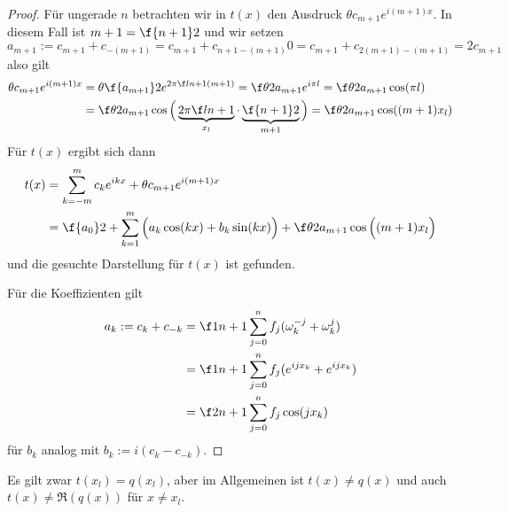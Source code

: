 \documentclass[11pt]{scrbook}
\begin{document}
\begin{st}
\begin{proof}
		Für ungerade $n$ betrachten wir in $t(x)$ den Ausdruck $\theta c_{m+1} e^{i(m+1)x}$.
		In diesem Fall ist $m+1 = \f {n+1}2$ und wir setzen 
		\[
			a_{m+1} := c_{m+1} + c_{-(m+1)} = c_{m+1} + c_{n+1-(m+1)}0= c_{m+1} + c_{2(m+1)-(m+1)} = 2 c_{m+1}
		\]
		also gilt
		\begin{align*}
			\theta c_{m+1} e^{i(m+1)x} 
			&= \theta \f {a_{m+1}}2 e^{2\pi \f l{n+1}(m+1)}
			= \f \theta 2 a_{m+1} e^{i\pi l}
			= \f \theta 2 a_{m+1} \cos(\pi l) \\
			&= \f \theta 2 a_{m+1} \cos\Big( \underbrace{2 \pi \f l{n+1}}_{x_l} \cdot \underbrace{\f {n+1}2}_{m+1} \Big) 
			= \f \theta 2 a_{m+1} \cos((m+1)x_l)
		\end{align*}
		Für $t(x)$ ergibt sich dann
		\begin{align*}
			t(x) &= \sum_{k=-m}^m c_k e^{ikx} + \theta c_{m+1} e^{i(m+1)x}\\
			&= \f {a_0}2 + \sum_{k=1}^m \Big(a_k \cos(kx) + b_k \sin(kx)\Big) + \f \theta 2 a_{m+1} \cos\Big((m+1)x_l\Big)
		\end{align*}
		und die gesuchte Darstellung für $t(x)$ ist gefunden.

		Für die Koeffizienten gilt 
		\begin{align*}
			a_k:= c_k + c_{-k} &= \f 1{n+1}\sum_{j=0}^n f_j (\omega_k^{-j}+\omega_k^j) \\
			&= \f 1{n+1} \sum_{j=0}^n f_j(e^{ijx_k} + e^{ijx_k})\\
			&= \f 2{n+1} \sum_{j=0}^n f_j \cos (jx_k)
		\end{align*}
		für $b_k$ analog mit $b_k := i(c_k -c_{-k})$.
	\end{proof}
	\begin{note}
		Es gilt zwar $t(x_l)=q(x_l)$, aber im Allgemeinen ist $t(x)\neq q(x)$ und auch $t(x)\neq \Re(q(x))$ für $x\neq x_l$.
	\end{note}
\end{st}
\end{document}
